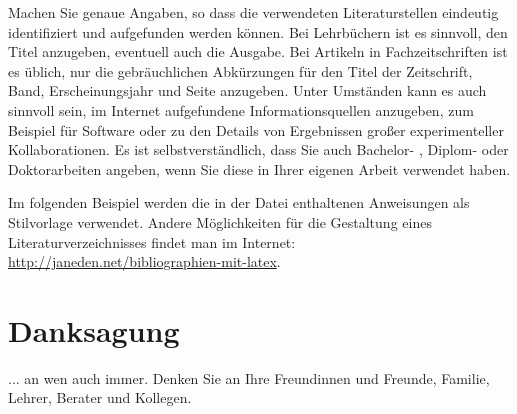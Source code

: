 \documentclass[a4paper,11pt,oneside,final,german,openbib,pdftex]{scrbook}
\begin{document}
\begin{appendix}
Machen Sie genaue Angaben, so dass die verwendeten Literaturstellen 
eindeutig identifiziert und aufgefunden werden k\"onnen.
Bei Lehrb\"uchern \cite{Weinberg:1995mt} ist es sinnvoll, 
den Titel anzugeben, eventuell auch die Ausgabe. Bei Artikeln in 
Fachzeitschriften \cite{Moch:2001zr} ist es \"ublich, nur die 
gebr\"auchlichen Abk\"urzungen f\"ur den Titel der Zeitschrift, Band, 
Erscheinungsjahr und Seite anzugeben. Unter Umst\"anden kann es auch 
sinnvoll sein, im Internet aufgefundene Informationsquellen anzugeben, 
zum Beispiel f\"ur Software \cite{LoopTools} oder zu den Details von 
Ergebnissen gro{\ss}er experimenteller Kollaborationen. Es ist 
selbstverst\"andlich, dass Sie auch Bachelor- \cite{BA:Freund}, 
Diplom- oder Doktorarbeiten angeben, wenn Sie diese in Ihrer eigenen 
Arbeit verwendet haben.\cite{B2Book}
\medskip

Im folgenden Beispiel werden die in der Datei %
enthaltenen Anweisungen als Stilvorlage verwendet. Andere 
M\"oglichkeiten f\"ur die Gestaltung eines Literaturverzeichnisses 
findet man im Internet: \url{http://janeden.net/bibliographien-mit-latex}.


\nocite{*}



%


\printbibliography


\chapter{Danksagung}

... an wen auch immer. Denken Sie an Ihre Freundinnen und Freunde, 
Familie, Lehrer, Berater und Kollegen.

\end{appendix}
\end{document}
